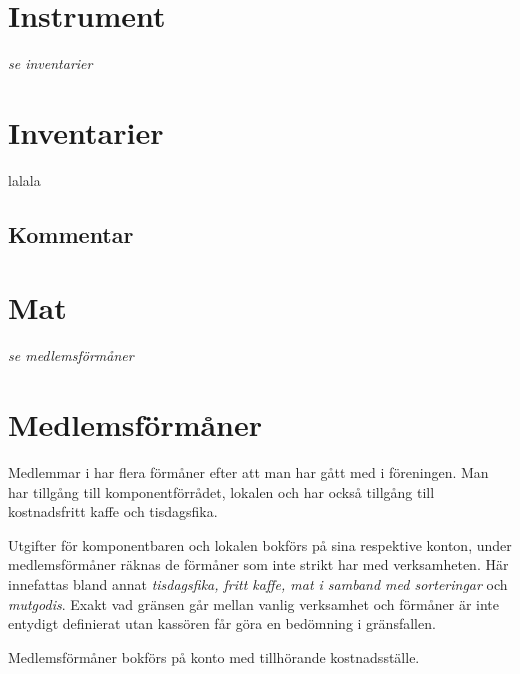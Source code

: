 				\section{Instrument}
				\emph{se inventarier}
			
				\section{Inventarier}
				
				lalala
			
				\begin{redovisning}
					
				\end{redovisning}
			
				\begin{bokslut}
					
				\end{bokslut}
			
				\subsection{Kommentar}
				\emph{}
			
				\section{Mat}
				\emph{se medlemsförmåner}
			
				\section{Medlemsförmåner}
				
				Medlemmar i  har flera förmåner efter att man har gått med i föreningen. Man har tillgång till komponentförrådet, lokalen och har också tillgång till kostnadsfritt kaffe och tisdagsfika.
		
		Utgifter för komponentbaren och lokalen bokförs på sina respektive konton, under medlemsförmåner räknas de förmåner som inte strikt har med verksamheten. Här innefattas bland annat \emph{tisdagsfika, fritt kaffe, mat i samband med sorteringar} och \emph{mutgodis}. Exakt vad gränsen går mellan vanlig verksamhet och förmåner är inte entydigt definierat utan kassören får göra en bedömning i gränsfallen.
		
			
				\begin{redovisning}
					Medlemsförmåner bokförs på konto  med tillhörande kostnadsställe.
				\end{redovisning}
			
